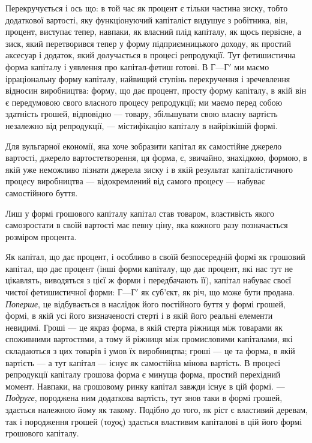 Перекручується і ось що: в той час як процент є тільки
частина зиску, тобто додаткової вартості, яку функціонуючий
капіталіст видушує з робітника, він, процент, виступає тепер,
навпаки, як власний плід капіталу, як щось первісне, а зиск,
який перетворився тепер у форму підприємницького доходу,
як простий аксесуар і додаток, який долучається в процесі репродукції.
Тут фетишистична форма капіталу і уявлення про
капітал-фетиш готові. В $Г — Г'$ ми маємо ірраціональну форму
капіталу, найвищий ступінь перекручення і зречевлення відносин
виробництва: форму, що дає процент, просту форму капіталу,
в якій він є передумовою свого власного процесу репродукції;
ми маємо перед собою здатність грошей, відповідно —
товару, збільшувати свою власну вартість незалежно від репродукції,
— містифікацію капіталу в найрізкішій формі.

Для вульгарної економії, яка хоче зобразити капітал як самостійне
джерело вартості, джерело вартостетворення, ця форма,
є, звичайно, знахідкою, формою, в якій уже неможливо пізнати
джерела зиску і в якій результат капіталістичного процесу
виробництва — відокремлений від самого процесу — набуває самостійного
буття.

Лиш у формі грошового капіталу капітал став товаром,
властивість якого самозростати в своїй вартості має певну ціну,
яка кожного разу позначається розміром процента.

Як капітал, що дає процент, і особливо в своїй безпосередній
формі як грошовий капітал, що дає процент (інші форми капіталу,
що дає процент, які нас тут не цікавлять, виводяться
з цієї ж форми і передбачають її), капітал набуває своєї чистої
фетишистичної форми: $Г — Г'$ як суб’єкт, як річ, що може бути
продана. \emph{Поперше}, це відбувається в наслідок його постійного
буття у формі грошей, формі, в якій усі його визначеності стерті
і в якій його реальні елементи невидимі. Гроші — це якраз форма,
в якій стерта ріжниця між товарами як споживними вартостями,
а тому й ріжниця між промисловими капіталами, які складаються з
цих товарів і умов їх виробництва; гроші — це та форма, в якій
вартість — а тут капітал — існує як самостійна мінова вартість.
В процесі репродукції капіталу грошова форма є минуща форма,
простий перехідний момент. Навпаки, на грошовому ринку капітал
завжди існує в цій формі. — \emph{Подруге}, породжена ним додаткова
вартість, тут знов таки в формі грошей, здається належною
йому як такому. Подібно до того, як ріст є властивий
деревам, так і породження грошей (τοχος) здається властивим
капіталові в цій його формі грошового капіталу.

